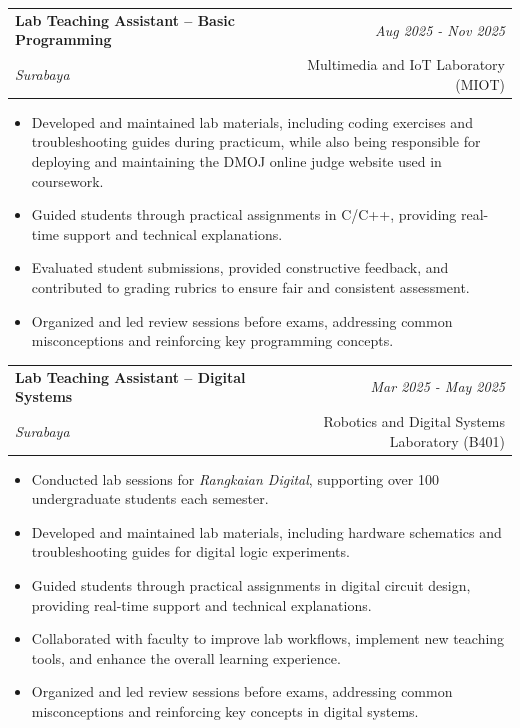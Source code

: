 \documentclass[a4paper,11pt]{article}
\makeatletter
\newcommand{\resumeSubheading}[4]{
\vspace{0.5mm}\item
    \begin{tabular*}{0.98\textwidth}[t]{l@{\extracolsep{\fill}}r}
        \textbf{#1} & \textit{\footnotesize{#4}} \\
        \textit{\footnotesize{#3}} &  \footnotesize{#2}\\
    \end{tabular*}
    \vspace{-2.4mm}
}
\newcommand{\resumeItemListStart}{\begin{justify}\begin{itemize}[leftmargin=3ex, rightmargin=2ex, noitemsep,labelsep=1.2mm,itemsep=0mm]\small}
\newcommand{\resumeItemListEnd}{\end{itemize}\end{justify}\vspace{-2mm}}
\makeatother
\begin{document}
\resumeSubheading
{Lab Teaching Assistant – Basic Programming}{Multimedia and IoT Laboratory (MIOT)}
{Surabaya}{Aug 2025 - Nov 2025}
\resumeItemListStart
\item {Developed and maintained lab materials, including coding exercises and troubleshooting guides during practicum, while also being responsible for deploying and maintaining the DMOJ online judge website used in coursework.}
\item {Guided students through practical assignments in C/C++, providing real-time support and technical explanations.}
\item {Evaluated student submissions, provided constructive feedback, and contributed to grading rubrics to ensure fair and consistent assessment.}
\item {Organized and led review sessions before exams, addressing common misconceptions and reinforcing key programming concepts.}
\resumeItemListEnd
\vspace{-2mm}

\resumeSubheading
{Lab Teaching Assistant – Digital Systems}{Robotics and Digital Systems Laboratory (B401)}
{Surabaya}{Mar 2025 - May 2025}
\resumeItemListStart
\item {Conducted lab sessions for \textit{Rangkaian Digital}, supporting over 100 undergraduate students each semester.}
\item {Developed and maintained lab materials, including hardware schematics and troubleshooting guides for digital logic experiments.}
\item {Guided students through practical assignments in digital circuit design, providing real-time support and technical explanations.}
\item {Collaborated with faculty to improve lab workflows, implement new teaching tools, and enhance the overall learning experience.}
\item {Organized and led review sessions before exams, addressing common misconceptions and reinforcing key concepts in digital systems.}
\resumeItemListEnd
\vspace{-2mm}
\end{document}
